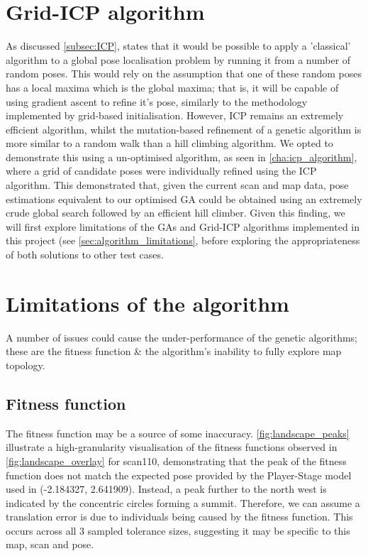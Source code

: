 \documentclass[authoryearcitations]{UoYCSproject}
\begin{document}
\section{Grid-ICP algorithm}
\color{red}
As discussed \autoref{subsec:ICP}, \citet{Censi2005-iv} states that it would be possible to apply a 'classical' algorithm to a global pose localisation problem by running it from a number of random poses. This would rely on the assumption that one of these random poses has a local maxima which is the global maxima; that is, it will be capable of using gradient ascent to refine it's pose, similarly to the methodology implemented by grid-based initialisation. However, ICP remains an extremely efficient algorithm, whilst the mutation-based refinement of a genetic algorithm is more similar to a random walk than a hill climbing algorithm. We opted to demonstrate this using a un-optimised algorithm, as seen in \autoref{cha:icp_algorithm}, where a grid of candidate poses were individually refined using the ICP algorithm. This demonstrated that, given the current scan and map data, pose estimations equivalent to our optimised GA could be obtained using an extremely crude global search followed by an efficient hill climber. Given this finding, we will first explore limitations of the GAs and Grid-ICP algorithms implemented in this project (see \autoref{sec:algorithm_limitations}, before exploring the appropriateness of both solutions to other test cases.
\color{black}

\section{Limitations of the algorithm}
\label{sec:algorithm_limitations}
A number of issues could cause the under-performance of the genetic algorithms; these are the fitness function \& the algorithm's inability to fully explore map topology.

\subsection{Fitness function}
\label{subsec:criticism_fitness_func}
The fitness function may be a source of some inaccuracy. \autoref{fig:landscape_peaks} illustrate a high-granularity visualisation of the fitness functions observed in \autoref{fig:landscape_overlay} for scan110, demonstrating that the peak of the fitness function does not match the expected pose provided by the Player-Stage model used in \citet{Lenac2011-co}(-2.184327, 2.641909). Instead, a peak further to the north west is indicated by the concentric circles forming a summit. Therefore, we can assume a translation error is due to individuals being caused by the fitness function. This occurs across all 3 sampled tolerance sizes, suggesting it may be specific to this map, scan and pose. \newline
\end{document}
